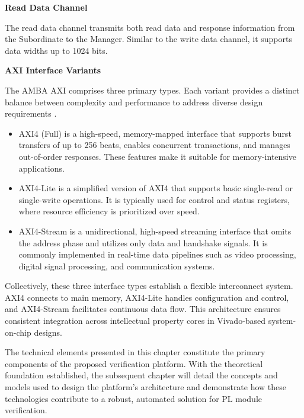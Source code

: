 \textbf{Read Data Channel}

The read data channel transmits both read data and response information from the Subordinate to the Manager. Similar to the write data channel, it supports data widths up to 1024 bits.

\textbf{\acs{AXI} Interface Variants}

The \acs{AMBA} \acs{AXI} comprises three primary types. Each variant provides a distinct balance between complexity and performance to address diverse design requirements \cite{Xilinx_AXI}.

\begin{itemize}
	\item AXI4 (Full) is a high-speed, memory-mapped interface that supports burst transfers of up to 256 beats, enables concurrent transactions, and manages out-of-order responses. These features make it suitable for memory-intensive applications.
	\item AXI4-Lite is a simplified version of AXI4 that supports basic single-read or single-write operations. It is typically used for control and status registers, where resource efficiency is prioritized over speed.
	\item AXI4-Stream is a unidirectional, high-speed streaming interface that omits the address phase and utilizes only data and handshake signals. It is commonly implemented in real-time data pipelines such as video processing, digital signal processing, and communication systems.
\end{itemize}

Collectively, these three interface types establish a flexible interconnect system. AXI4 connects to main memory, AXI4-Lite handles configuration and control, and AXI4-Stream facilitates continuous data flow. This architecture ensures consistent integration across intellectual property cores in Vivado-based system-on-chip designs\cite{AXI_INTERFACES}\cite{Xilinx_AXI}.

The technical elements presented in this chapter constitute the primary components of the proposed verification platform. With the theoretical foundation established, the subsequent chapter will detail the concepts and models used to design the platform’s architecture and demonstrate how these technologies contribute to a robust, automated solution for \acs{PL} module verification.

